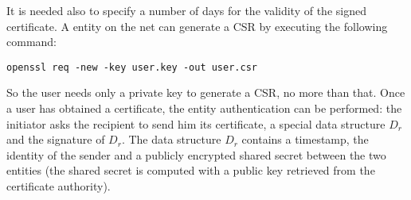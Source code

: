 \documentclass{article}
\begin{document}
It is needed also to specify a number of days for the validity of the signed certificate.\newline
A entity on the net can generate a CSR by executing the following command:

\begin{lstlisting}[breaklines]
	openssl req -new -key user.key -out user.csr
\end{lstlisting}

So the user needs only a private key to generate a CSR, no more than that. Once a user has obtained a certificate, the entity authentication can be performed: the initiator asks the recipient to send him its certificate, a special data structure \textit{$D_r$} and the signature of \textit{$D_r$}. The data structure \textit{$D_r$} contains a timestamp, the identity of the sender and a publicly encrypted shared secret between the two entities (the shared secret is computed with a public key retrieved from the certificate authority).
\end{document}
